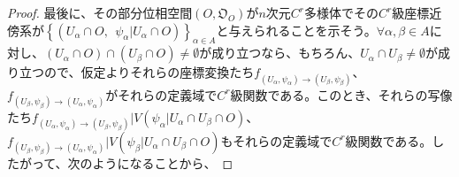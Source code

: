 \documentclass[dvipdfmx]{jsarticle}
\begin{document}
\begin{proof}
最後に、その部分位相空間$\left( O,\mathfrak{O}_{O} \right)$が$n$次元$C^{r}$多様体でその$C^{r}$級座標近傍系が$\left\{ \left( U_{\alpha} \cap O,\ \ \psi_{\alpha}|U_{\alpha} \cap O \right) \right\}_{\alpha \in A}$と与えられることを示そう。$\forall\alpha,\beta \in A$に対し、$\left( U_{\alpha} \cap O \right) \cap \left( U_{\beta} \cap O \right) \neq \emptyset$が成り立つなら、もちろん、$U_{\alpha} \cap U_{\beta} \neq \emptyset$が成り立つので、仮定よりそれらの座標変換たち$f_{\left( U_{\alpha},\psi_{\alpha} \right) \rightarrow \left( U_{\beta},\psi_{\beta} \right)}$、$f_{\left( U_{\beta},\psi_{\beta} \right) \rightarrow \left( U_{\alpha},\psi_{\alpha} \right)}$がそれらの定義域で$C^{r}$級関数である。このとき、それらの写像たち$f_{\left( U_{\alpha},\psi_{\alpha} \right) \rightarrow \left( U_{\beta},\psi_{\beta} \right)}|V\left( \psi_{\alpha}|U_{\alpha} \cap U_{\beta} \cap O \right)$、$f_{\left( U_{\beta},\psi_{\beta} \right) \rightarrow \left( U_{\alpha},\psi_{\alpha} \right)}|V\left( \psi_{\beta}|U_{\alpha} \cap U_{\beta} \cap O \right)$もそれらの定義域で$C^{r}$級関数である。したがって、次のようになることから、
\begin{comment}
\begin{align*}
&\quad f_{\left( U_{\alpha} \cap O,\psi_{\alpha}|U_{\alpha} \cap O \right) \rightarrow \left( U_{\beta} \cap O,\psi_{\beta}|U_{\beta} \cap O \right)}\\
&= \left( \psi_{\beta}|U_{\beta} \cap O \right)|U_{\alpha} \cap U_{\beta} \cap O \circ \left( \psi_{\alpha}|U_{\alpha} \cap O \right)^{- 1}|V\left( \psi_{\alpha}|U_{\alpha} \cap U_{\beta} \cap O \right)\\
&= U_{\alpha} \cap U_{\beta} \cap O\overset{\psi_{\beta}|U_{\alpha} \cap U_{\beta}}{\rightarrow}V\left( \psi_{\beta}|U_{\alpha} \cap U_{\beta} \cap O \right) \circ V\left( \psi_{\alpha}|U_{\alpha} \cap U_{\beta} \cap O \right)\overset{\psi_{\alpha}^{- 1}|V\left( \psi_{\alpha}|U_{\alpha} \cap U_{\beta} \right)}{\rightarrow}U_{\alpha} \cap U_{\beta} \cap O\\
&= V\left( \psi_{\alpha}|U_{\alpha} \cap U_{\beta} \cap O \right)\overset{\psi_{\alpha}^{- 1}|V\left( \psi_{\alpha}|U_{\alpha} \cap U_{\beta} \right)}{\rightarrow}U_{\alpha} \cap U_{\beta} \cap O\overset{\psi_{\beta}|U_{\alpha} \cap U_{\beta}}{\rightarrow}V\left( \psi_{\beta}|U_{\alpha} \cap U_{\beta} \cap O \right)\\
&= V\left( \psi_{\alpha}|U_{\alpha} \cap U_{\beta} \cap O \right)\overset{\psi_{\beta}|U_{\alpha} \cap U_{\beta} \circ \psi_{\alpha}^{- 1}|V\left( \psi_{\alpha}|U_{\alpha} \cap U_{\beta} \right)}{\rightarrow}V\left( \psi_{\beta}|U_{\alpha} \cap U_{\beta} \cap O \right)\\

\end{comment}
\end{proof}
\end{document}
